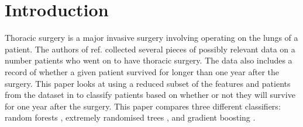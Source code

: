 \documentclass[journal]{IEEEtran}
\begin{document}




\maketitle









%
\IEEEpeerreviewmaketitle

\section{Introduction}
Thoracic surgery is a major invasive surgery involving operating on the lungs of a patient. The authors of ref. \cite{zikeba2014boosted} collected several pieces of possibly relevant data on a number patients who went on to have thoracic surgery. The data also includes a record of whether a given patient survived for longer than one year after the surgery. This paper looks at using a reduced subset of the features and patients from the dataset in \cite{zikeba2014boosted} to classify patients based on whether or not they will survive for one year after the surgery. This paper compares three different classifiers: random forests \cite{breiman2001random}, extremely randomised trees \cite{geurts2006extremely}, and gradient boosting \cite{natekin2013gradient}. 
\end{document}
